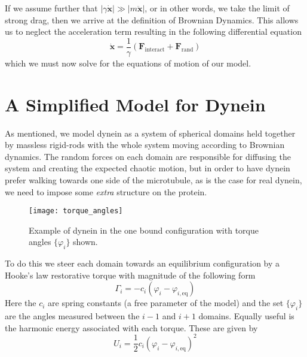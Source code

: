 	If we assume further that $|\gamma\dot{\mathbf{x}}|\gg |m\ddot{\mathbf{x}}|$, or in other words, we take the limit of strong drag, then we arrive at the definition of Brownian Dynamics. This allows us to neglect the acceleration term resulting in the following differential equation
	\begin{equation}
		\dot{\mathbf{x}} = \frac{1}{\gamma}\left( \mathbf{F}_\text{interact} + \mathbf{F}_\text{rand} \right)
	\end{equation}
	which we must now solve for the equations of motion of our model. 
	
	
	\section{A Simplified Model for Dynein}
	As mentioned, we model dynein as a system of spherical domains held together by massless rigid-rods with the whole system moving according to Brownian dynamics. The random forces on each domain are responsible for diffusing the system and creating the expected chaotic motion, but in order to have dynein prefer walking towards one side of the microtubule, as is the case for real dynein, we need to impose some \textit{extra} structure on the protein. 
	
	\begin{figure}[hbt!]
		\centering
		\texttt{[image: torque\_angles]}
		\caption{Example of dynein in the one bound configuration with torque angles $\{\varphi_i\}$ shown.}
		\label{fig:torque angles}
	\end{figure}
	
	To do this we steer each domain towards an equilibrium configuration by a Hooke's law restorative torque with magnitude of the following form
	\begin{equation}
		\Gamma_i = -c_i\left(\varphi_i-\varphi_{i,\text{eq}}\right)
	\end{equation}
	Here the $c_i$ are spring constants (a free parameter of the model) and the set $\{\varphi_i\}$ are the angles measured between the $i-1$ and $i+1$ domains. Equally useful is the harmonic energy associated with each torque. These are given by
	\begin{equation}
		U_i = \frac{1}{2}c_i(\varphi_i-\varphi_{i,\text{eq}})^2
	\end{equation} 
	
